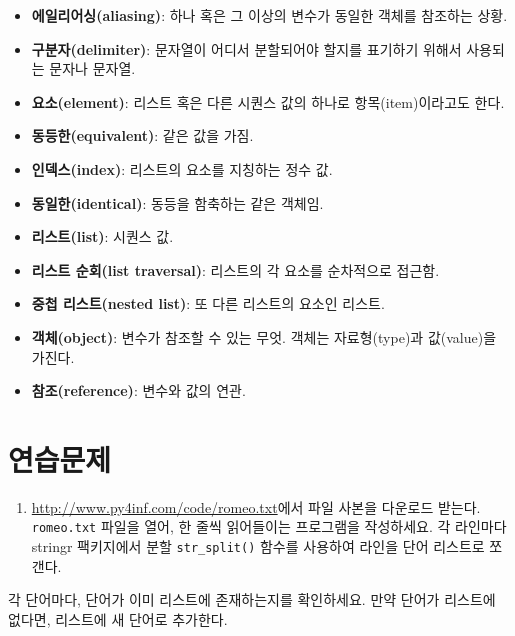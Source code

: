 \documentclass[
  letterpaper,
]{book}
\providecommand{\tightlist}{%
  \setlength{\itemsep}{0pt}\setlength{\parskip}{0pt}}\usepackage{longtable,booktabs,array}
\begin{document}
\begin{itemize}
\tightlist
\item
  \textbf{에일리어싱(aliasing)}: 하나 혹은 그 이상의 변수가 동일한
  객체를 참조하는 상황. 
\item
  \textbf{구분자(delimiter)}: 문자열이 어디서 분할되어야 할지를 표기하기
  위해서 사용되는 문자나 문자열. 
\item
  \textbf{요소(element)}: 리스트 혹은 다른 시퀀스 값의 하나로
  항목(item)이라고도 한다. 
\item
  \textbf{동등한(equivalent)}: 같은 값을 가짐. 
\item
  \textbf{인덱스(index)}: 리스트의 요소를 지칭하는 정수 값.
  \\
\item
  \textbf{동일한(identical)}: 동등을 함축하는 같은 객체임.
\item
  \textbf{리스트(list)}: 시퀀스 값. 
\item
  \textbf{리스트 순회(list traversal)}: 리스트의 각 요소를 순차적으로
  접근함. 
\item
  \textbf{중첩 리스트(nested list)}: 또 다른 리스트의 요소인 리스트.
\item
  \textbf{객체(object)}: 변수가 참조할 수 있는 무엇. 객체는
  자료형(type)과 값(value)을 가진다. 
\item
  \textbf{참조(reference)}: 변수와 값의 연관. 
\end{itemize}

\section*{연습문제}\label{r-list-ex}


\begin{enumerate}
\def\labelenumi{\arabic{enumi}.}
\tightlist
\item
  \url{http://www.py4inf.com/code/romeo.txt}에서 파일 사본을 다운로드
  받는다. \texttt{romeo.txt} 파일을 열어, 한 줄씩 읽어들이는 프로그램을
  작성하세요. 각 라인마다 stringr 팩키지에서 분할 \texttt{str\_split()}
  함수를 사용하여 라인을 단어 리스트로 쪼갠다. 
\end{enumerate}

각 단어마다, 단어가 이미 리스트에 존재하는지를 확인하세요. 만약 단어가
리스트에 없다면, 리스트에 새 단어로 추가한다.
\end{document}
